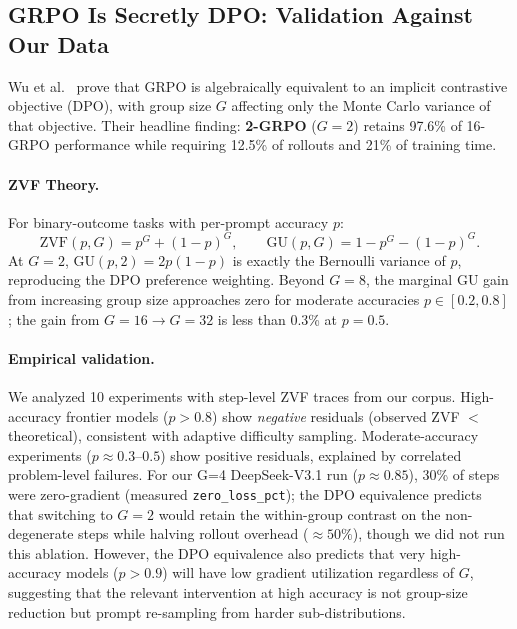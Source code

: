\documentclass{article}
\begin{document}
\subsection{GRPO Is Secretly DPO: Validation Against Our Data}
\label{sec:grpo-dpo}

Wu et al.~\cite{wu2025grpo_dpo} prove that GRPO is algebraically equivalent to
an implicit contrastive objective (DPO), with group size $G$ affecting only
the Monte Carlo variance of that objective. Their headline finding: \textbf{2-GRPO}
($G=2$) retains 97.6\% of 16-GRPO performance while requiring 12.5\% of rollouts
and 21\% of training time.

\paragraph{ZVF Theory.}
For binary-outcome tasks with per-prompt accuracy $p$:
\[
  \mathrm{ZVF}(p, G) = p^G + (1-p)^G, \qquad
  \mathrm{GU}(p, G) = 1 - p^G - (1-p)^G.
\]
At $G=2$, $\mathrm{GU}(p,2) = 2p(1-p)$ is exactly the Bernoulli variance of $p$,
reproducing the DPO preference weighting.
Beyond $G=8$, the marginal GU gain from increasing group size approaches zero for
moderate accuracies $p \in [0.2, 0.8]$; the gain from $G=16 \to G=32$ is less
than 0.3\% at $p=0.5$.

\paragraph{Empirical validation.}
We analyzed 10 experiments with step-level ZVF traces from our corpus.
High-accuracy frontier models ($p > 0.8$) show \emph{negative} residuals
(observed ZVF $<$ theoretical), consistent with adaptive difficulty sampling.
Moderate-accuracy experiments ($p \approx 0.3$--$0.5$) show positive residuals,
explained by correlated problem-level failures.
For our G=4 DeepSeek-V3.1 run ($p \approx 0.85$), 30\% of steps were
zero-gradient (measured \texttt{zero\_loss\_pct}); the DPO equivalence predicts
that switching to $G = 2$ would retain the within-group contrast on the
non-degenerate steps while halving rollout overhead ($\approx 50\%$), though we
did not run this ablation.
However, the DPO equivalence also predicts that very high-accuracy models
($p > 0.9$) will have low gradient utilization regardless of $G$, suggesting
that the relevant intervention at high accuracy is not group-size reduction
but prompt re-sampling from harder sub-distributions.
\end{document}
